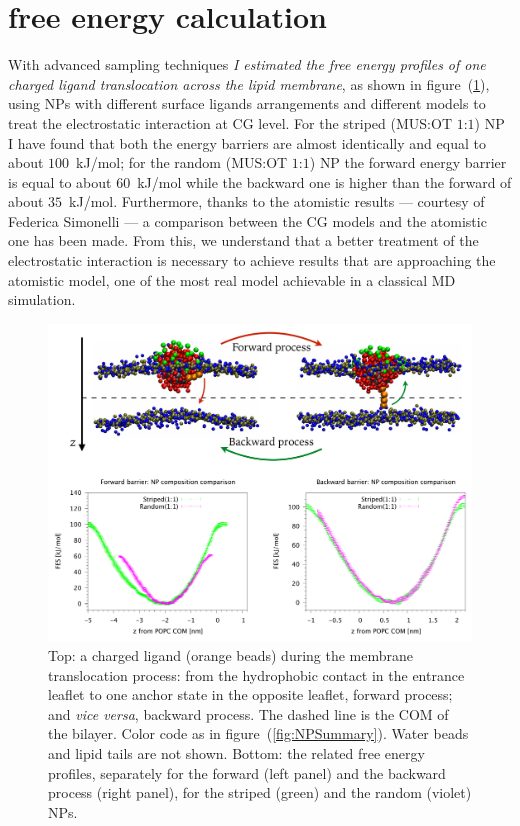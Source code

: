 
\section{free energy calculation}
With advanced sampling techniques \textit{I estimated the free energy profiles of one charged ligand translocation across the lipid membrane}, as shown in figure~(\ref{fig:coglionazzo}), using \acp{NP} with different surface ligands arrangements and different models to treat the electrostatic interaction at \ac{CG} level. For the striped (\acs{MUS}:\acs{OT} $1$:$1$) \ac{NP} I have found that both the energy barriers are almost identically and equal to about $100$~kJ/mol; for the random (\acs{MUS}:\acs{OT} $1$:$1$) \ac{NP} the forward energy barrier is equal to about $60$~kJ/mol while the backward one is higher than the forward of about $35$~kJ/mol. Furthermore, thanks to the atomistic results --- courtesy of Federica Simonelli --- a comparison between the \ac{CG} models and the atomistic one has been made. From this, we understand that a better treatment of the electrostatic interaction is necessary to achieve results that are approaching the atomistic model, one of the most real model achievable in a classical \ac{MD} simulation.

\begin{figure}[ht]
	\center
	\includegraphics[width=\textwidth]{./img/coglionazzo}
	\caption{Top: a charged ligand (orange beads) during the membrane translocation process: from the hydrophobic contact in the entrance leaflet to one anchor state in the opposite leaflet, forward process; and \textit{vice versa}, backward process. The dashed line is the \acs{COM} of the bilayer. Color code as in figure~(\ref{fig:NPSummary}). Water beads and lipid tails are not shown. Bottom: the related free energy profiles, separately for the forward (left panel) and the backward process (right panel), for the striped (green) and the random (violet) \acp{NP}. }
	\label{fig:coglionazzo}
\end{figure}

